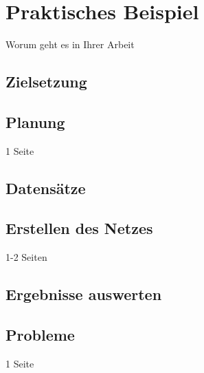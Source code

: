 \chapter{Praktisches Beispiel}
\label{chap:praktischesBeispiel}
Worum geht es in Ihrer Arbeit

\section{Zielsetzung}
\label{sec:zielsetzung}
\printsubchapterauthor{\authorMarco}

\section{Planung}
\label{sec:planung}
\printsubchapterauthor{\authorNiklas}
1 Seite

\section{Datens\"atze}
\label{sec:datensaetze}
\printsubchapterauthor{\authorMarco}

\section{Erstellen des Netzes}
\label{sec:erstellenDesNetzes}
\printsubchapterauthor{\authorNiklas}
1-2 Seiten

\section{Ergebnisse auswerten}
\label{sec:ergebnisseAuswerten}
\printsubchapterauthor{\authorMarco}

\section{Probleme}
\label{sec:probleme}
\printsubchapterauthor{\authorNiklas}
1 Seite